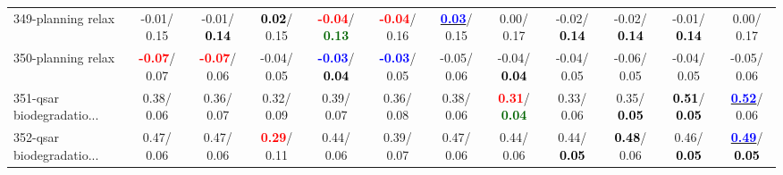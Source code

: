 \begin{table}[h]
\begin{center}
{\begin{tabular}{lc|c|c|c|c|c|c|c|c|c|c}
349-planning relax &  -0.01/  0.15 &  -0.01/\textcolor{black}{\textbf{  0.14}} & \textcolor{black}{\textbf{  0.02}}/  0.15 & \textcolor{red}{\textbf{ -0.04}}/\textcolor{darkgreen}{\textbf{  0.13}} & \textcolor{red}{\textbf{ -0.04}}/  0.16 & \underline{\textcolor{blue}{\textbf{  0.03}}}/  0.15 &   0.00/  0.17 &  -0.02/\textcolor{black}{\textbf{  0.14}} &  -0.02/\textcolor{black}{\textbf{  0.14}} &  -0.01/\textcolor{black}{\textbf{  0.14}} &   0.00/  0.17 \\
350-planning relax & \textcolor{red}{\textbf{ -0.07}}/  0.07 & \textcolor{red}{\textbf{ -0.07}}/  0.06 &  -0.04/  0.05 & \textcolor{blue}{\textbf{ -0.03}}/\textcolor{black}{\textbf{  0.04}} & \textcolor{blue}{\textbf{ -0.03}}/  0.05 &  -0.05/  0.06 &  -0.04/\textcolor{black}{\textbf{  0.04}} &  -0.04/  0.05 &  -0.06/  0.05 &  -0.04/  0.05 &  -0.05/  0.06 \\
351-qsar biodegradatio... &   0.38/  0.06 &   0.36/  0.07 &   0.32/  0.09 &   0.39/  0.07 &   0.36/  0.08 &   0.38/  0.06 & \textcolor{red}{\textbf{  0.31}}/\textcolor{darkgreen}{\textbf{  0.04}} &   0.33/  0.06 &   0.35/\textcolor{black}{\textbf{  0.05}} & \textcolor{black}{\textbf{  0.51}}/\textcolor{black}{\textbf{  0.05}} & \underline{\textcolor{blue}{\textbf{  0.52}}}/  0.06 \\
352-qsar biodegradatio... &   0.47/  0.06 &   0.47/  0.06 & \textcolor{red}{\textbf{  0.29}}/  0.11 &   0.44/  0.06 &   0.39/  0.07 &   0.47/  0.06 &   0.44/  0.06 &   0.44/\textcolor{black}{\textbf{  0.05}} & \textcolor{black}{\textbf{  0.48}}/  0.06 &   0.46/\textcolor{black}{\textbf{  0.05}} & \underline{\textcolor{blue}{\textbf{  0.49}}}/\textcolor{black}{\textbf{  0.05}} \\\end{tabular}}\label{stratsALCKappa10AllReduxa}
\end{center}
\end{table}
